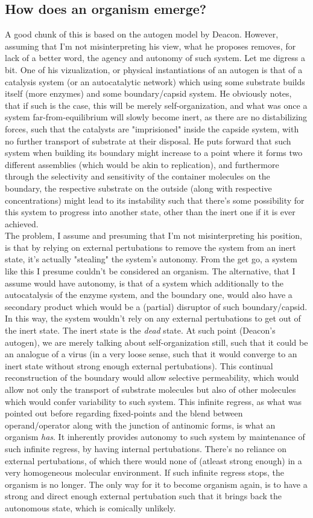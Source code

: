 \documentclass[a4paper,12pt,twoside,leqno]{article}
\begin{document}
\subsection*{How does an organism emerge?}
A good chunk of this is based on the autogen model by Deacon. However, assuming that I'm not misinterpreting his view, what he proposes removes, for lack of a better word, the agency and autonomy of such system. Let me digress a bit. One of his vizualization, or physical instantiations of an autogen is that of a catalysis system (or an autocatalytic network) which using some substrate builds itself (more enzymes) and some boundary/capsid system. He obviously notes, that if such is the case, this will be merely self-organization, and what was once a system far-from-equilibrium will slowly become inert, as there are no distabilizing forces, such that the catalysts are "imprisioned" inside the capside system, with no further transport of substrate at their disposal. He puts forward that such system when building its boundary might increase to a point where it forms two different assemblies (which would be akin to replication), and furthermore through the selectivity and sensitivity of the container molecules on the boundary, the respective substrate on the outside (along with respective concentrations) might lead to its instability such that there's some possibility for this system to progress into another state, other than the inert one if it is ever achieved.\\
The problem, I assume and presuming that I'm not misinterpreting his position, is that by relying on external pertubations to remove the system from an inert state, it's actually "stealing" the system's autonomy. From the get go, a system like this I presume couldn't be considered an organism. The alternative, that I assume would have autonomy, is that of a system which additionally to the autocatalysis of the enzyme system, and the boundary one, would also have a secondary product which would be a (partial) disruptor of such boundary/capsid. In this way, the system wouldn't rely on any external pertubations to get out of the inert state. The inert state is the \textit{dead} state. At such point (Deacon's autogen), we are merely talking about self-organization still, such that it could be an analogue of a virus (in a very loose sense, such that it would converge to an inert state without strong enough external pertubations). This continual reconstruction of the boundary would allow selective permeability, which would allow not only the transport of substrate molecules but also of other molecules which would confer variability to such system. This infinite regress, as what was pointed out before regarding fixed-points and the blend between operand/operator along with the junction of antinomic forms, is what an organism \textit{has}. It inherently provides autonomy to such system by maintenance of such infinite regress, by having internal pertubations. There's no reliance on external pertubations, of which there would none of (atleast strong enough) in a very homogeneous molecular environment. If such infinite regress stops, the organism is no longer. The only way for it to become organism again, is to have a strong and direct enough external pertubation such that it brings back the autonomous state, which is comically unlikely.
\end{document}
